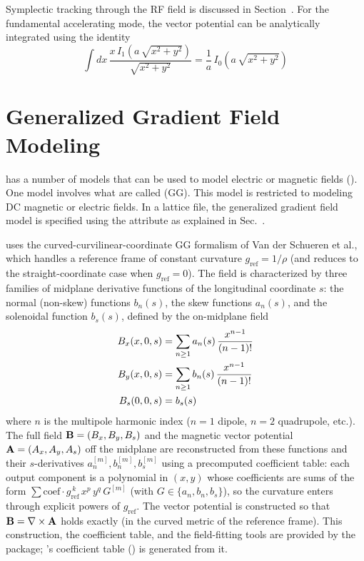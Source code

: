 Symplectic tracking through the RF field is discussed in Section~.  For the
fundamental accelerating mode, the vector potential can be analytically integrated using the
identity
\begin{equation}
  \int dx \,\frac{x \, I_1 (a \, \sqrt{x^2+y^2})}{\sqrt{x^2+y^2}}  = 
  \frac{1}{a} \, I_0 (a \, \sqrt{x^2+y^2})
\end{equation}

\section{Generalized Gradient Field Modeling}
\label{s:gen.grad.phys}

\bmad has a number of  models that can be used to model electric or magnetic fields
(). One model involves what are called  (GG). This model
is restricted to modeling DC magnetic or electric fields. In a lattice file, the generalized
gradient field model is specified using the  attribute as explained in
Sec.~.

\bmad uses the curved-curvilinear-coordinate GG formalism of Van der Schueren et
al.\cite{b:gen.grad.curved}, which handles a reference frame of constant curvature $g_{\text{ref}} =
1/\rho$ (and reduces to the straight-coordinate case when $g_{\text{ref}} = 0$). The field is
characterized by three families of midplane derivative functions of the longitudinal coordinate $s$:
the normal (non-skew) functions $b_n(s)$, the skew functions $a_n(s)$, and the solenoidal function
$b_s(s)$, defined by the on-midplane field
\begin{align}
  B_x(x, 0, s) &= \sum_{n \ge 1} a_n(s) \, \frac{x^{n-1}}{(n-1)!} \nonumber \\
  B_y(x, 0, s) &= \sum_{n \ge 1} b_n(s) \, \frac{x^{n-1}}{(n-1)!} \\
  B_s(0, 0, s) &= b_s(s) \nonumber
\end{align}
where $n$ is the multipole harmonic index ($n = 1$ dipole, $n = 2$ quadrupole, etc.). The full field
${\bf B} = (B_x, B_y, B_s)$ and the magnetic vector potential ${\bf A} = (A_x, A_y, A_s)$ off the midplane
are reconstructed from these functions and their $s$-derivatives $a_n^{[m]}, b_n^{[m]}, b_s^{[m]}$
using a precomputed coefficient table: each output component is a polynomial in $(x, y)$ whose
coefficients are sums of the form $\sum \text{coef} \cdot g_{\text{ref}}^{\,k} \, x^p \, y^q \, G^{[m]}$
(with $G \in \{a_n, b_n, b_s\}$), so the curvature enters through explicit powers of $g_{\text{ref}}$.
The vector potential is constructed so that ${\bf B} = \nabla \times {\bf A}$ holds exactly (in the curved
metric of the reference frame). This construction, the coefficient table, and the field-fitting
tools are provided by the  package\cite{b:gen.grad.jl}; \bmad's
coefficient table () is generated from it.


